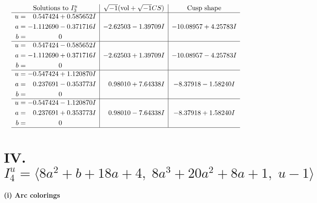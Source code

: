 \documentclass[1p]{elsarticle_modified}
\theoremstyle{definition}
\newcommand{\I}{\sqrt{-1}}
\begin{document}
$$\begin{array}{c|c|c}  
\text{Solutions to }I^u_{3}& \I (\text{vol} + \sqrt{-1}CS) & \text{Cusp shape}\\
 \hline 
\begin{aligned}
u &= \phantom{-}0.547424 + 0.585652 I \\
a &= -1.112690 - 0.371716 I \\
b &= \phantom{-0.000000 } 0\end{aligned}
 & -2.62503 - 1.39709 I & -10.08957 + 4.25783 I \\ \hline\begin{aligned}
u &= \phantom{-}0.547424 - 0.585652 I \\
a &= -1.112690 + 0.371716 I \\
b &= \phantom{-0.000000 } 0\end{aligned}
 & -2.62503 + 1.39709 I & -10.08957 - 4.25783 I \\ \hline\begin{aligned}
u &= -0.547424 + 1.120870 I \\
a &= \phantom{-}0.237691 - 0.353773 I \\
b &= \phantom{-0.000000 } 0\end{aligned}
 & \phantom{-}0.98010 + 7.64338 I & -8.37918 - 1.58240 I \\ \hline\begin{aligned}
u &= -0.547424 - 1.120870 I \\
a &= \phantom{-}0.237691 + 0.353773 I \\
b &= \phantom{-0.000000 } 0\end{aligned}
 & \phantom{-}0.98010 - 7.64338 I & -8.37918 + 1.58240 I\\
 \hline 
 \end{array}$$\newpage\newpage\renewcommand{\arraystretch}{1}
\centering \section*{IV. $I^u_{4}= \langle 8 a^2+b+18 a+4,\;8 a^3+20 a^2+8 a+1,\;u-1 \rangle$}
\flushleft \textbf{(i) Arc colorings}\\
\end{document}
